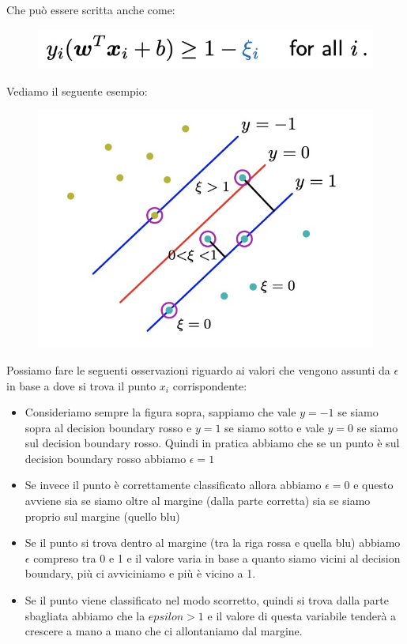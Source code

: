 \documentclass[14pt]{extreport}
\begin{document}
Che può essere scritta anche come:

\begin{figure}[H]
	\centering
	\includegraphics[width=0.7\linewidth]{321.jpeg}
\end{figure}

Vediamo il seguente esempio:

\begin{figure}[H]
	\centering
	\includegraphics[width=0.7\linewidth]{322.jpeg}
	\label{fig1}
	\caption{}
\end{figure}

Possiamo fare le seguenti osservazioni riguardo ai valori che vengono assunti da $\epsilon$ in base a dove si trova il punto $x_i$ corrispondente:
\begin{itemize}
	\item Consideriamo sempre la figura sopra, sappiamo che vale $y=-1$ se siamo sopra al decision boundary rosso e $y=1$ se siamo sotto e vale $y=0$
	      se siamo sul decision boundary rosso. Quindi in pratica abbiamo che se un punto è sul decision boundary rosso abbiamo $\epsilon=1$
	\item Se invece il punto è correttamente classificato allora abbiamo $\epsilon=0$ e questo avviene sia se siamo oltre al margine (dalla parte
	      corretta) sia se siamo proprio sul margine (quello blu)
	\item Se il punto si trova dentro al margine (tra la riga rossa e quella blu) abbiamo $\epsilon$ compreso tra 0 e 1 e il valore varia in base a
	      quanto siamo vicini al decision boundary, più ci avviciniamo e più è vicino a 1.
	\item Se il punto viene classificato nel modo scorretto, quindi si trova dalla parte sbagliata abbiamo che la $epsilon > 1$ e il valore di questa
	      variabile tenderà a crescere a mano a mano che ci allontaniamo dal margine.
\end{itemize}
\end{document}
